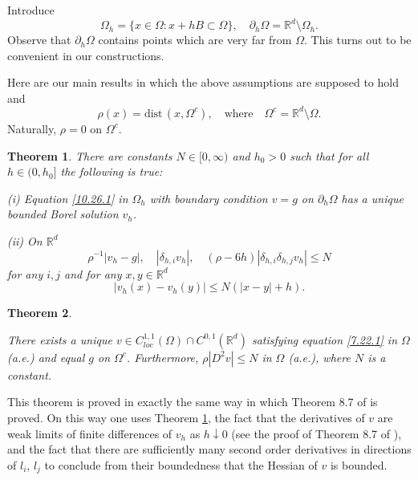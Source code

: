 \documentclass[11pt, reqno]{amsart}
\newtheorem{theorem}{Theorem}[section]
\theoremstyle{definition}
\theoremstyle{remark}
\begin{document}
Introduce
$$
\Omega_{h}=\{x\in \Omega:x+hB\subset \Omega\},\quad
\partial_{h}\Omega= {\mathbb{R}}^{d}\setminus \Omega_{h}.
$$ 
 Observe that $\partial_{h}\Omega$ contains points
which are very far from $\Omega$. This turns out to be convenient
in our constructions.

Here are our main results in which the above assumptions
are supposed to hold and
$$
\rho(x)=\text{dist}\,(x,\Omega^{c}),\quad\text{where}\quad
\Omega^{c}={\mathbb{R}}^{d}\setminus\Omega.
$$
Naturally, $\rho=0$ on $\Omega^{c}$.
\begin{theorem}
                                        \label{theorem 7.22.1}
There are  constants $N\in[0,\infty)$ and $h_{0}>0$ such that
for all  $h\in(0,h_{0}]$
  the following is true:

(i) Equation \eqref{10.26.1} in $\Omega_{h}$ with  
boundary condition $v=g$ on $\partial_{h}\Omega$ has a unique
bounded Borel solution $v _{h}$.

(ii) On ${\mathbb{R}}^{d}$
\begin{equation}
                                                    \label{6.25.3}
\rho^{-1}|v _{h}-g |,\quad|\delta_{h,i}v _{h}|,\quad
  (\rho-6h)|\delta_{h,i}\delta_{h,j} v_{h}|\leq N
\end{equation}
for any $i,j$ and for any $x,y\in{\mathbb{R}}^{d}$
\begin{equation}
                                                    \label{7.29.1}
|v _{h}(x)-v _{h}(y)|\leq N(|x-y|+h).
\end{equation}
 

\end{theorem}

\begin{theorem}
                                        \label{theorem 7.22.2}

 There exists a unique $v \in C^{1,1}_{loc}(\Omega)\cap
 C^{0,1}({\mathbb{R}}^{d})$
satisfying 
equation \eqref{7.22.1} in $\Omega$ (a.e.) and
equal $g$ on $\Omega^{c}$. Furthermore,  
 $\rho|D^{2}v |\leq N$ in $\Omega$ (a.e.),
where $N$ is a constant.

\end{theorem}
This theorem is proved in exactly the same way in which 
Theorem 8.7 of \cite{Kr11} is proved. On this way
one uses Theorem \ref{theorem 7.22.1}, 
 the fact that the derivatives of $v$ are weak limits
of finite differences of $v_{h}$ as $h\downarrow0$
(see the proof of Theorem 8.7 of \cite{Kr11}), and the fact 
that 
  there are sufficiently many
  second order derivatives in directions
of $l_{i}$, $l_{j}$ to conclude from their boundedness
that the Hessian of $v$ is bounded.
\end{document}
